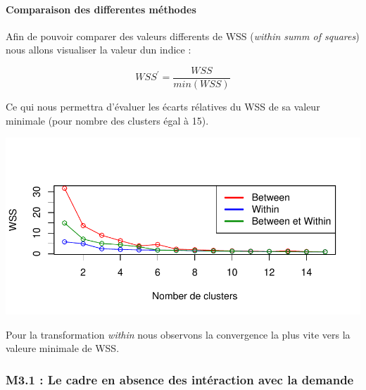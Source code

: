 \documentclass[11pt,]{article}
\let\oldparagraph\paragraph
\renewcommand{\paragraph}[1]{\oldparagraph{#1}\mbox{}}
\begin{document}
\hypertarget{comparaison-des-differentes-methodes}{%
\paragraph{Comparaison des differentes
méthodes}\label{comparaison-des-differentes-methodes}}

Afin de pouvoir comparer des valeurs differents de WSS (\emph{within
summ of squares}) nous allons visualiser la valeur dun indice :

\begin{equation*}
    WSS^{'} = \frac{WSS}{min(WSS)}
\end{equation*}

Ce qui nous permettra d'évaluer les écarts rélatives du WSS de sa valeur
minimale (pour nombre des clusters égal à 15).

\FloatBarrier

\begin{center}\includegraphics{note2pres_files/figure-latex/unnamed-chunk-41-1} \end{center}

\FloatBarrier

Pour la transformation \emph{within} nous observons la convergence la
plus vite vers la valeure minimale de WSS.

\hypertarget{m3.1-le-cadre-en-absence-des-interaction-avec-la-demande}{%
\subsubsection{M3.1 : Le cadre en absence des intéraction avec la
demande}\label{m3.1-le-cadre-en-absence-des-interaction-avec-la-demande}}

\FloatBarrier
\end{document}
